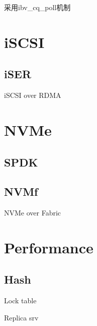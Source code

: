 采用ibv\_cq\_poll机制

\section{iSCSI}

\subsection{iSER}

iSCSI over RDMA

\section{NVMe}

\subsection{SPDK}

\subsection{NVMf}

NVMe over Fabric

\section{Performance}

\subsection{Hash}

\begin{enumbox}
\item Lock table
\item Replica srv
\end{enumbox}
